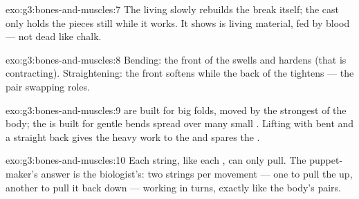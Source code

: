 \begin{solution}{exo:g3:bones-and-muscles:7}
The living  slowly rebuilds the break itself; the cast only
holds the pieces still while it works. It shows  is living
material, fed by blood --- not dead like chalk.
\end{solution}

\begin{solution}{exo:g3:bones-and-muscles:8}
Bending: the front of the  swells and hardens (that  is
contracting). Straightening: the front softens while the back of
the  tightens --- the pair swapping roles.
\end{solution}

\begin{solution}{exo:g3:bones-and-muscles:9}
 are  built for big folds, moved by the strongest
 of the body; the  is built for gentle bends spread
over many small . Lifting with bent  and a straight
back gives the heavy work to the  and spares the .
\end{solution}

\begin{solution}{exo:g3:bones-and-muscles:10}
Each string, like each , can only pull. The puppet-maker's
answer is the biologist's: two strings per movement --- one to
pull the  up, another to pull it back down --- working in
turns, exactly like the body's  pairs.
\end{solution}
